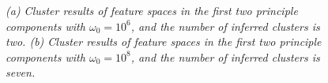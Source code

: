 \documentclass[journal]{IEEEtran}
\begin{document}
\begin{figure}[!htbp]
\centering

  \caption{\label{fig:Tuning_Parameter}\small \emph{(a) Cluster results of feature spaces in the first two principle components with $\omega_0=10^{6}$, and the number of inferred clusters is two. (b) Cluster results of feature spaces in the first two principle components with $\omega_0=10^{8}$, and the number of inferred clusters is seven.
   }}
\end{figure}
\end{document}
